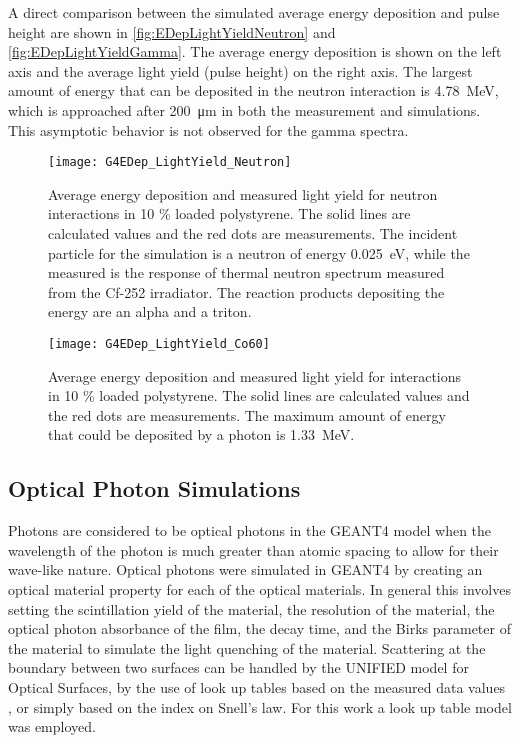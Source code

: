 A direct comparison between the simulated average energy deposition and pulse height are shown in \autoref{fig:EDepLightYieldNeutron} and \autoref{fig:EDepLightYieldGamma}. 
The average energy deposition is shown on the left axis and the average light yield (pulse height) on the right axis.
The largest amount of energy that can be deposited in the neutron interaction is \SI{4.78}{\MeV}, which is approached after \SI{200}{\um} in both the measurement and simulations.
This asymptotic behavior is not observed for the gamma spectra.
\begin{figure}
	\centering
    	\texttt{[image: G4EDep\_LightYield\_Neutron]}
	\caption[Average Light Yield and Energy Deposition for neutron interactions in PS]{Average energy deposition and measured light yield for neutron interactions in 10 \% loaded polystyrene. The solid lines are calculated values and the red dots are measurements. The incident particle for the simulation is a neutron of energy \SI{0.025}{\eV}, while the measured is the response of thermal neutron spectrum measured from the Cf-252 irradiator. The reaction products depositing the energy are an alpha and a triton.}
	\label{fig:EDepLightYieldNeutron}
\end{figure}
\begin{figure}
	\centering
    	\texttt{[image: G4EDep\_LightYield\_Co60]}
	\caption[Average Light Yield and Energy Deposition for Gamma interactions in PS]{Average energy deposition and measured light yield for  interactions in 10 \% loaded polystyrene. The solid lines are calculated values and the red dots are measurements. The maximum amount of energy that could be deposited by a  photon is \SI{1.33}{\MeV}.}
	\label{fig:EDepLightYieldGamma}
\end{figure}

\subsection{Optical Photon Simulations}
\label{sec:OpticalPhotonSims}
Photons are considered to be optical photons in the GEANT4 model when the wavelength of the photon is much greater than atomic spacing to allow for their wave-like nature.
Optical photons were simulated in GEANT4 by creating an optical material property for each of the optical materials.
In general this involves setting the scintillation yield of the material, the resolution of the material, the optical photon absorbance of the film, the decay time, and the Birks parameter of the material to simulate the light quenching of the material.
Scattering at the boundary between two surfaces can be  handled by the UNIFIED model for Optical Surfaces, by the use of look up tables based on the measured data values \cite{5485130}, or simply based on the index on Snell's law.
For this work a look up table model was employed.


